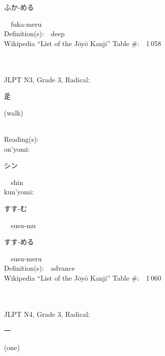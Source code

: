 \begin{multicols}{2}
{\hspace*{2em}}{\begin{CJK}{UTF8}{min} ふか-める \end{CJK}}\ \ fuka-meru\ \ \\
Definition(s):\ \ deep \\
Wikipedia ``List of the J\=oy\=o Kanji'' Table \#:\ \ 1\,058 \\
\ \ \\
{\fontsize{34pt}{40pt}  }\ \ \\  %
{JLPT N3, Grade 3, Radical:\ \ {\begin{CJK}{UTF8}{min} 辵 \end{CJK}} (walk) } \\
Reading(s):\ \ \\
{\hspace*{1em}}on'yomi:\ \ \\
{\hspace*{2em}}{\begin{CJK}{UTF8}{min} シン \end{CJK}}\ \ shin\ \ \\
{\hspace*{1em}}kun'yomi:\ \ \\
{\hspace*{2em}}{\begin{CJK}{UTF8}{min} すす-む \end{CJK}}\ \ susu-mu\ \ \\
{\hspace*{2em}}{\begin{CJK}{UTF8}{min} すす-める \end{CJK}}\ \ susu-meru\ \ \\
Definition(s):\ \ advance \\
Wikipedia ``List of the J\=oy\=o Kanji'' Table \#:\ \ 1\,060 \\
\ \ \\
{\fontsize{34pt}{40pt}  }\ \ \\  %
{JLPT N4, Grade 3, Radical:\ \ {\begin{CJK}{UTF8}{min} 一 \end{CJK}} (one) } \\

\end{multicols}
